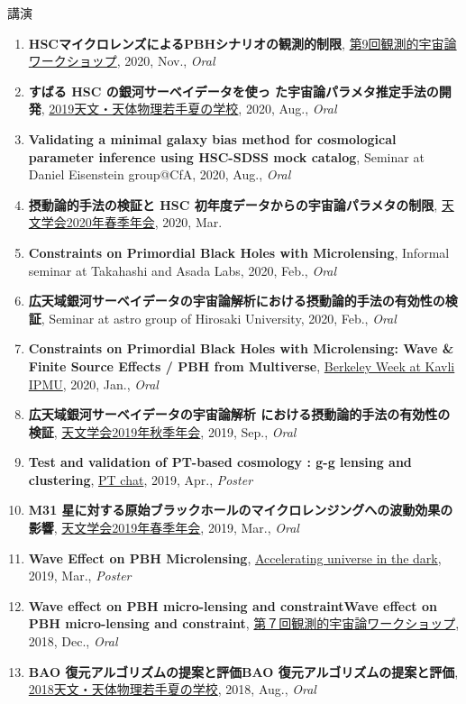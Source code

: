 \begin{rSection}{講演}
\begin{enumerate}
\item \textbf{HSCマイクロレンズによるPBHシナリオの観測的制限}, \href{https://indico.ipmu.jp/event/382/timetable/#all}{第9回観測的宇宙論ワークショップ}, 2020, Nov., \textit{Oral}
\item \textbf{すばる HSC の銀河サーベイデータを使っ た宇宙論パラメタ推定手法の開発}, \href{http://www.astro-wakate.org/ss2019/web/}{2019天文・天体物理若手夏の学校}, 2020, Aug., \textit{Oral}
\item \textbf{Validating a minimal galaxy bias method for cosmological parameter inference using HSC-SDSS mock catalog}, Seminar at Daniel Eisenstein group@CfA, 2020, Aug., \textit{Oral}
\item \textbf{摂動論的手法の検証と HSC 初年度データからの宇宙論パラメタの制限}, \href{http://www.asj.or.jp/nenkai/archive/2020a/pdf/U03a.pdf}{天文学会2020年春季年会}, 2020, Mar.
\item \textbf{Constraints on Primordial Black Holes with Microlensing}, Informal seminar at Takahashi and Asada Labs, 2020, Feb., \textit{Oral}
\item \textbf{広天域銀河サーベイデータの宇宙論解析における摂動論的手法の有効性の検証}, Seminar at astro group of Hirosaki University, 2020, Feb., \textit{Oral}
\item \textbf{Constraints on Primordial Black Holes with Microlensing: Wave \& Finite Source Effects / PBH from Multiverse}, \href{http://indico.ipmu.jp/event/313/overview}{Berkeley Week at Kavli IPMU}, 2020, Jan., \textit{Oral}
\item \textbf{広天域銀河サーベイデータの宇宙論解析 における摂動論的手法の有効性の検証}, \href{https://www.asj.or.jp/nenkai/archive/2019b/pdf/U20a.pdf}{天文学会2019年秋季年会}, 2019, Sep., \textit{Oral}
\item \textbf{Test and validation of PT-based cosmology : g-g lensing and clustering}, \href{http://pt-chat-kyoto.sciencesconf.org/}{PT chat}, 2019, Apr., \textit{Poster}
\item \textbf{M31 星に対する原始ブラックホールのマイクロレンジングへの波動効果の影響}, \href{https://www.asj.or.jp/nenkai/archive/2019a/pdf/U14a.pdf}{天文学会2019年春季年会}, 2019, Mar., \textit{Oral}
\item \textbf{Wave Effect on PBH Microlensing}, \href{http://www2.yukawa.kyoto-u.ac.jp/~aud2019/index.php}{Accelerating universe in the dark}, 2019, Mar., \textit{Poster}
\item \textbf{Wave effect on PBH micro-lensing and constraintWave effect on PBH micro-lensing and constraint}, \href{http://web.cc.yamaguchi-u.ac.jp/~rsaito/obscosmo2018/}{第７回観測的宇宙論ワークショップ}, 2018, Dec., \textit{Oral}
\item \textbf{BAO 復元アルゴリズムの提案と評価BAO 復元アルゴリズムの提案と評価}, \href{http://www.astro-wakate.org/ss2018/web/link.html}{2018天文・天体物理若手夏の学校}, 2018, Aug., \textit{Oral}
\end{enumerate}\end{rSection}
